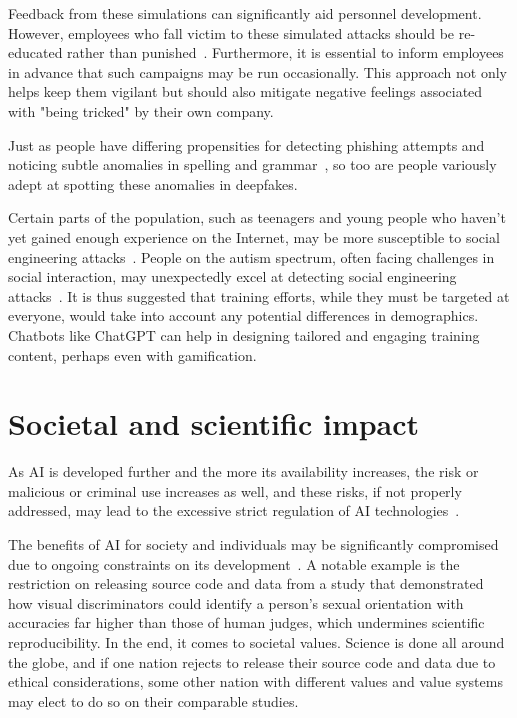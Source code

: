 Feedback from these simulations can significantly aid personnel development. However, employees who fall victim to these simulated attacks should be re-educated rather than punished~\citep{mitnick_The_Art_of_Deception_2003}. Furthermore, it is essential to inform employees in advance that such campaigns may be run occasionally. This approach not only helps keep them vigilant but should also mitigate negative feelings associated with "being tricked" by their own company.

Just as people have differing propensities for detecting phishing attempts and noticing subtle anomalies in spelling and grammar~\citep{nicholson_Investigating_Teenagers_Detect_Phishing_2020, neupane_Social_Disorders_Facilitate_SE_2018}, so too are people variously adept at spotting these anomalies in deepfakes.

%
%
Certain parts of the population, such as teenagers and young people who haven't yet gained enough experience on the Internet, may be more susceptible to social engineering attacks~\citep{nicholson_Investigating_Teenagers_Detect_Phishing_2020}. People on the autism spectrum, often facing challenges in social interaction, may unexpectedly excel at detecting social engineering attacks~\citep{neupane_Social_Disorders_Facilitate_SE_2018}. It is thus suggested that training efforts, while they must be targeted at everyone, would take into account any potential differences in demographics. Chatbots like ChatGPT can help in designing tailored and engaging training content, perhaps even with gamification.





\section{Societal and scientific impact}
\begin{comment}
\end{comment}
As AI is developed further and the more its availability increases, the risk or malicious or criminal use increases as well, and these risks, if not properly addressed, may lead to the excessive strict regulation of AI technologies~\citep{king_AI_Crime_Interdisciplinary_Analysis_2019}.

The benefits of AI for society and individuals may be significantly compromised due to ongoing constraints on its development~\citep{king_AI_Crime_Interdisciplinary_Analysis_2019}. A notable example is the restriction on releasing source code and data from a study that demonstrated how visual discriminators could identify a person's sexual orientation with accuracies far higher than those of human judges, which undermines scientific reproducibility. In the end, it comes to societal values. Science is done all around the globe, and if one nation rejects to release their source code and data due to ethical considerations, some other nation with different values and value systems may elect to do so on their comparable studies.

